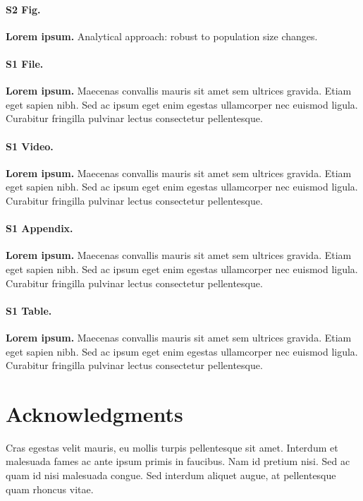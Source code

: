 \documentclass[10pt,letterpaper]{article}
\begin{document}
\paragraph*{S2 Fig.}
\label{S2_Fig}
{\bf Lorem ipsum.} Analytical approach: robust to population size changes.

\paragraph*{S1 File.}
\label{S1_File}
{\bf Lorem ipsum.}  Maecenas convallis mauris sit amet sem ultrices gravida. Etiam eget sapien nibh. Sed ac ipsum eget enim egestas ullamcorper nec euismod ligula. Curabitur fringilla pulvinar lectus consectetur pellentesque.

\paragraph*{S1 Video.}
\label{S1_Video}
{\bf Lorem ipsum.}  Maecenas convallis mauris sit amet sem ultrices gravida. Etiam eget sapien nibh. Sed ac ipsum eget enim egestas ullamcorper nec euismod ligula. Curabitur fringilla pulvinar lectus consectetur pellentesque.

\paragraph*{S1 Appendix.}
\label{S1_Appendix}
{\bf Lorem ipsum.} Maecenas convallis mauris sit amet sem ultrices gravida. Etiam eget sapien nibh. Sed ac ipsum eget enim egestas ullamcorper nec euismod ligula. Curabitur fringilla pulvinar lectus consectetur pellentesque.

\paragraph*{S1 Table.}
\label{S1_Table}
{\bf Lorem ipsum.} Maecenas convallis mauris sit amet sem ultrices gravida. Etiam eget sapien nibh. Sed ac ipsum eget enim egestas ullamcorper nec euismod ligula. Curabitur fringilla pulvinar lectus consectetur pellentesque.

\section*{Acknowledgments}
Cras egestas velit mauris, eu mollis turpis pellentesque sit amet. Interdum et malesuada fames ac ante ipsum primis in faucibus. Nam id pretium nisi. Sed ac quam id nisi malesuada congue. Sed interdum aliquet augue, at pellentesque quam rhoncus vitae.

\nolinenumbers

%
%
% 

\end{document}
